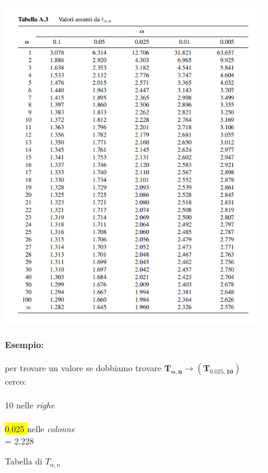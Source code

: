 \documentclass[]{article}
\begin{document}
    \begin{figure}[H]
        \caption{Tabella di $T_{\alpha, n}$}
        \begin{minipage}{0.59\textwidth}
            \includegraphics[width=\textwidth]{images/tan_table.png}
        \end{minipage}
        \begin{minipage}{0.4\textwidth}
            \paragraph{Esempio:} per trovare un valore
            se dobbiamo trovare $\boldsymbol{T_{\alpha,n} \rightarrow (T_{0.025,10})}$ \\
            cerco: \\ \\
            \colorbox{bittersweet}{10} nelle \textit{righe} \\ \\
            \colorbox{yellow}{0.025
            } nelle \textit{colonne} \\
            = 2.228
        \end{minipage}
    \end{figure}
\end{document}
